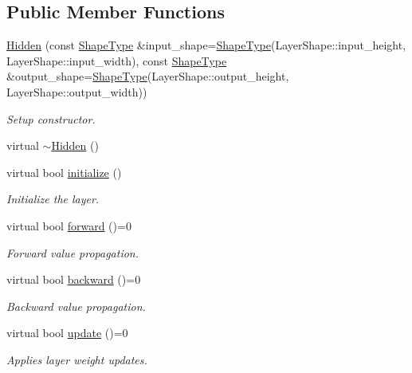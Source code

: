 \subsection*{Public Member Functions}
\begin{DoxyCompactItemize}
\item 
\hyperlink{classffnn_1_1layer_1_1_hidden_a3caeb739cac8995496db207e32900fca}{Hidden} (const \hyperlink{classffnn_1_1layer_1_1_hidden_abdfcf81b3846fae3b19a207424695df0}{Shape\-Type} \&input\-\_\-shape=\hyperlink{classffnn_1_1layer_1_1_hidden_abdfcf81b3846fae3b19a207424695df0}{Shape\-Type}(Layer\-Shape\-::input\-\_\-height, Layer\-Shape\-::input\-\_\-width), const \hyperlink{classffnn_1_1layer_1_1_hidden_abdfcf81b3846fae3b19a207424695df0}{Shape\-Type} \&output\-\_\-shape=\hyperlink{classffnn_1_1layer_1_1_hidden_abdfcf81b3846fae3b19a207424695df0}{Shape\-Type}(Layer\-Shape\-::output\-\_\-height, Layer\-Shape\-::output\-\_\-width))
\begin{DoxyCompactList}\small\item\em Setup constructor. \end{DoxyCompactList}\item 
virtual \hyperlink{classffnn_1_1layer_1_1_hidden_ae4d85d69e2da92c3b70992e0c3ced4d1}{$\sim$\-Hidden} ()
\item 
virtual bool \hyperlink{classffnn_1_1layer_1_1_hidden_adb70b4a8f5ac4979689f86cab73f48b1}{initialize} ()
\begin{DoxyCompactList}\small\item\em Initialize the layer. \end{DoxyCompactList}\item 
virtual bool \hyperlink{classffnn_1_1layer_1_1_hidden_a600b86d72826e8be3eafa53e040e9cbe}{forward} ()=0
\begin{DoxyCompactList}\small\item\em Forward value propagation. \end{DoxyCompactList}\item 
virtual bool \hyperlink{classffnn_1_1layer_1_1_hidden_aac0ee89390b02ff4731678883dd402dd}{backward} ()=0
\begin{DoxyCompactList}\small\item\em Backward value propagation. \end{DoxyCompactList}\item 
virtual bool \hyperlink{classffnn_1_1layer_1_1_hidden_ae038d2a1e64fcbbde6166df7d0573ef8}{update} ()=0
\begin{DoxyCompactList}\small\item\em Applies layer weight updates. \end{DoxyCompactList}\end{DoxyCompactItemize}
